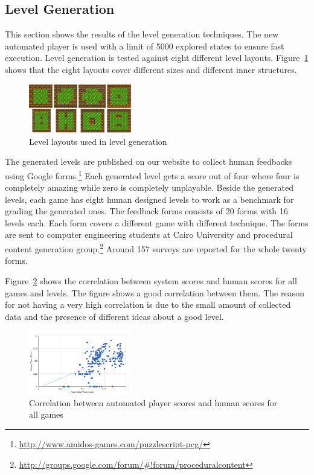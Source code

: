 \documentclass[letterpaper]{article}
\newcommand{\figref}[1]{Figure~\ref{Figure:#1}}
\begin{document}
\subsection{Level Generation}
This section shows the results of the level generation techniques. The new automated player is used with a limit of 5000 explored states to ensure fast execution. Level generation is tested against eight different level layouts. \figref{levelLayouts} shows that the eight layouts cover different sizes and different inner structures.\\\par

\begin{figure}[ht]
  	\centering
    \includegraphics[width=0.4\textwidth]{Images/levelLayouts}
    \caption{Level layouts used in level generation}
    \label{Figure:levelLayouts}
\end{figure}

The generated levels are published on our website to collect human feedbacks using Google forms.\footnote{\url{http://www.amidos-games.com/puzzlescript-pcg/}} Each generated level gets a score out of four where four is completely amazing while zero is completely unplayable. Beside the generated levels, each game has eight human designed levels to work as a benchmark for grading the generated ones. The feedback forms consists of 20 forms with 16 levels each. Each form covers a different game with different technique. The forms are sent to computer engineering students at Cairo University and procedural content generation group.\footnote{\url{http://groups.google.com/forum/\#!forum/proceduralcontent}} Around 157 surveys are reported for the whole twenty forms.\\\par

\figref{totalCorrelation} shows the correlation between system scores and human scores for all games and levels. The figure shows a good correlation between them. The reason for not having a very high correlation is due to the small amount of collected data and the presence of different ideas about a good level.

\begin{figure}[ht]
  	\centering
    \includegraphics[width=0.4\textwidth]{Images/totalCorrelation}
    \caption{Correlation between automated player scores and human scores for all games}
    \label{Figure:totalCorrelation}
\end{figure}
\end{document}
